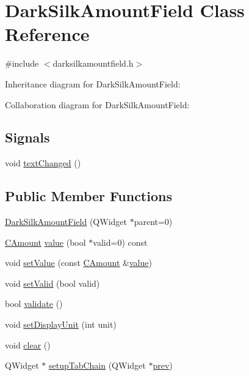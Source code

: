 \hypertarget{class_dark_silk_amount_field}{}\section{Dark\+Silk\+Amount\+Field Class Reference}
\label{class_dark_silk_amount_field}


{\ttfamily \#include $<$darksilkamountfield.\+h$>$}



Inheritance diagram for Dark\+Silk\+Amount\+Field\+:


Collaboration diagram for Dark\+Silk\+Amount\+Field\+:
\subsection*{Signals}
\begin{DoxyCompactItemize}
\item 
void \hyperlink{class_dark_silk_amount_field_a6bd63f434fb379d15e9f7ceb49dc32a4}{text\+Changed} ()
\end{DoxyCompactItemize}
\subsection*{Public Member Functions}
\begin{DoxyCompactItemize}
\item 
\hyperlink{class_dark_silk_amount_field_af3f4dac6cb74424b4c34113a65b0f1dc}{Dark\+Silk\+Amount\+Field} (Q\+Widget $\ast$parent=0)
\item 
\hyperlink{amount_8h_a4eaf3a5239714d8c45b851527f7cb564}{C\+Amount} \hyperlink{class_dark_silk_amount_field_a4d844a57eacd9ce9e0f3e665d0286875}{value} (bool $\ast$valid=0) const 
\item 
void \hyperlink{class_dark_silk_amount_field_af42cc558d9d38dfc7ce682cb8f01ed20}{set\+Value} (const \hyperlink{amount_8h_a4eaf3a5239714d8c45b851527f7cb564}{C\+Amount} \&\hyperlink{class_dark_silk_amount_field_ae533a06697225e95bade6a9df1c6b5d2}{value})
\item 
void \hyperlink{class_dark_silk_amount_field_acaeddf879d2dd948e232d0d7db80672b}{set\+Valid} (bool valid)
\item 
bool \hyperlink{class_dark_silk_amount_field_a6e48d59e5cf6de6469d3abddc7ac1aa2}{validate} ()
\item 
void \hyperlink{class_dark_silk_amount_field_a11567d5cc0b2012727bd915b7d8742c2}{set\+Display\+Unit} (int unit)
\item 
void \hyperlink{class_dark_silk_amount_field_aa54d8b110aa9d74f021917adae6bb33c}{clear} ()
\item 
Q\+Widget $\ast$ \hyperlink{class_dark_silk_amount_field_a13667990af05333c0a9ec59a399efb92}{setup\+Tab\+Chain} (Q\+Widget $\ast$\hyperlink{cache_8cc_aabbd2f01bb8ec4a7a0128bce5f8cdb1b}{prev})
\end{DoxyCompactItemize}
